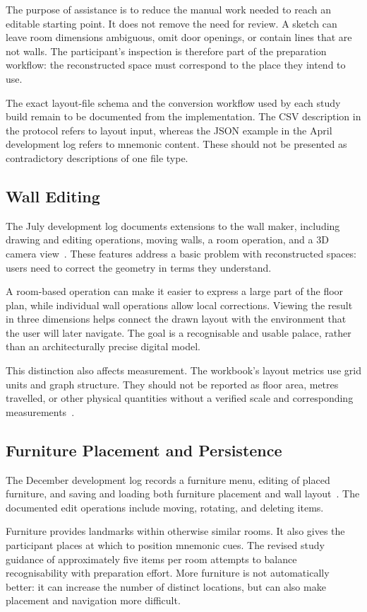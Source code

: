 The purpose of assistance is to reduce the manual work needed to reach an editable starting point. It does not remove the need for review. A sketch can leave room dimensions ambiguous, omit door openings, or contain lines that are not walls. The participant's inspection is therefore part of the preparation workflow: the reconstructed space must correspond to the place they intend to use.

The exact layout-file schema and the conversion workflow used by each study build remain to be documented from the implementation. The CSV description in the protocol refers to layout input, whereas the JSON example in the April development log refers to mnemonic content. These should not be presented as contradictory descriptions of one file type.

\subsection{Wall Editing}
The July development log documents extensions to the wall maker, including drawing and editing operations, moving walls, a room operation, and a 3D camera view~\cite{logjuly17}. These features address a basic problem with reconstructed spaces: users need to correct the geometry in terms they understand.

A room-based operation can make it easier to express a large part of the floor plan, while individual wall operations allow local corrections. Viewing the result in three dimensions helps connect the drawn layout with the environment that the user will later navigate. The goal is a recognisable and usable palace, rather than an architecturally precise digital model.

This distinction also affects measurement. The workbook's layout metrics use grid units and graph structure. They should not be reported as floor area, metres travelled, or other physical quantities without a verified scale and corresponding measurements~\cite{srooranalysis}.

\subsection{Furniture Placement and Persistence}
The December development log records a furniture menu, editing of placed furniture, and saving and loading both furniture placement and wall layout~\cite{logdec18}. The documented edit operations include moving, rotating, and deleting items.

Furniture provides landmarks within otherwise similar rooms. It also gives the participant places at which to position mnemonic cues. The revised study guidance of approximately five items per room attempts to balance recognisability with preparation effort. More furniture is not automatically better: it can increase the number of distinct locations, but can also make placement and navigation more difficult.

